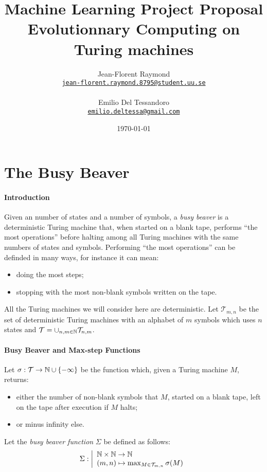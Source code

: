 \documentclass{article}
\title{Machine Learning Project Proposal\\\textbf{Evolutionnary Computing on\\Turing machines}}
\author{Jean-Florent Raymond\\\href{mailto:jean-florent.raymond.8795@student.uu.se}{\texttt{jean-florent.raymond.8795@student.uu.se}}\\
\\
Emilio Del Tessandoro\\
\href{mailto:emilio.deltessa@gmail.com}{\texttt{emilio.deltessa@gmail.com}}}
\date{\today}
\begin{document}
\maketitle

\section{The Busy Beaver}

\paragraph{Introduction} Given an number of states and a number of symbols, a \emph{busy beaver} is a deterministic Turing machine that, when started on a blank tape, performs ``the most operations'' before halting among all Turing machines with the same numbers of states and symbols. Performing ``the most operations'' can be definded in many ways, for instance it can mean:
\begin{itemize}
\item doing the most steps;
\item stopping with the most non-blank symbols written on the tape.
\end{itemize}

All the Turing machines we will consider here are deterministic. Let $\mathcal{T}_{m,n}$ be the set of deterministic Turing machines with an alphabet of $m$ symbols which uses $n$ states and $\mathcal{T} = \cup_{n,m \in \mathbb{N}} \mathcal{T}_{n,m}$.


\paragraph{Busy Beaver and Max-step Functions}
Let $\sigma : \mathcal{T} \to \mathbb{N} \cup \{-\infty\}$ be the function which, given a Turing machine $M$, returns:
\begin{itemize}
\item either the number of non-blank symbols that $M$, started on a blank tape, left on the tape after execution if $M$ halts;
\item or minus infinity else.
\end{itemize}

Let the \emph{busy beaver function} $\Sigma$ be defined as follows:
\[
\Sigma : \left |
\begin{array}{l}
\mathbb{N} \times \mathbb{N} \to \mathbb{N}\\
(m,n) \mapsto \max_{M \in \mathcal{T}_{m,n}} \sigma(M)
\end{array}
\right .
\]
\end{document}
